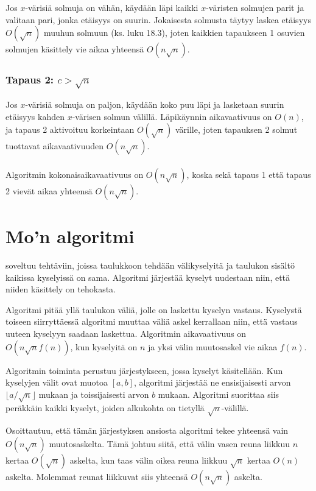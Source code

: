 Jos $x$-värisiä solmuja on vähän,
käydään läpi kaikki $x$-väristen solmujen parit
ja valitaan pari, jonka etäisyys on suurin.
Jokaisesta solmusta täytyy
laskea etäisyys $O(\sqrt n)$ muuhun solmuun (ks. luku 18.3),
joten kaikkien tapaukseen 1 osuvien solmujen
käsittely vie aikaa yhteensä $O(n \sqrt n)$.

\subsubsection*{Tapaus 2: $c > \sqrt n$}

Jos $x$-värisiä solmuja on paljon,
käydään koko puu läpi ja
lasketaan suurin etäisyys kahden
$x$-värisen solmun välillä.
Läpikäynnin aikavaativuus on $O(n)$,
ja tapaus 2 aktivoituu korkeintaan $O(\sqrt n)$
värille, joten tapauksen 2 solmut 
tuottavat aikavaativuuden $O(n \sqrt n)$.\\\\
\noindent
Algoritmin kokonaisaikavaativuus on $O(n \sqrt n)$,
koska sekä tapaus 1 että tapaus 2 vievät aikaa
yhteensä $O(n \sqrt n)$.

\section{Mo'n algoritmi}


 soveltuu tehtäviin,
joissa taulukkoon tehdään välikyselyitä ja
taulukon sisältö kaikissa kyselyissä on sama.
Algoritmi järjestää
kyselyt uudestaan niin,
että niiden käsittely on tehokasta.

Algoritmi pitää yllä taulukon väliä,
jolle on laskettu kyselyn vastaus.
Kyselystä toiseen siirryttäessä algoritmi
muuttaa väliä askel kerrallaan niin,
että vastaus uuteen kyselyyn saadaan laskettua.
Algoritmin aikavaativuus on $O(n \sqrt n f(n))$,
kun kyselyitä on $n$ ja 
yksi välin muutosaskel vie aikaa $f(n)$.

Algoritmin toiminta perustuu järjestykseen,
jossa kyselyt käsitellään.
Kun kyselyjen välit ovat muotoa $[a,b]$,
algoritmi järjestää ne ensisijaisesti arvon
$\lfloor a/\sqrt n \rfloor$ mukaan ja toissijaisesti arvon $b$ mukaan.
Algoritmi suorittaa siis peräkkäin kaikki kyselyt,
joiden alkukohta on tietyllä $\sqrt n$-välillä.

Osoittautuu, että tämän järjestyksen ansiosta
algoritmi tekee yhteensä vain $O(n \sqrt n)$ muutosaskelta.
Tämä johtuu siitä, että välin vasen reuna liikkuu
$n$ kertaa $O(\sqrt n)$ askelta,
kun taas välin oikea reuna liikkuu $\sqrt n$
kertaa $O(n)$ askelta. Molemmat reunat liikkuvat
siis yhteensä $O(n \sqrt n)$ askelta.

